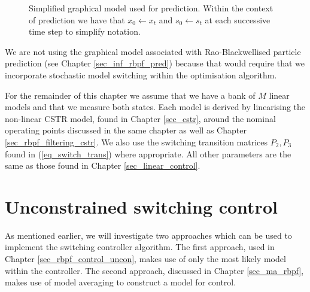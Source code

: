 \begin{figure}[H] 
\centering
{}
\caption{Simplified graphical model used for prediction. Within the context of prediction we have that $x_0 \leftarrow x_t$ and $s_0 \leftarrow s_t$ at each successive time step to simplify notation.}
\label{fig_gm_prediction}
\end{figure}
We are not using the graphical model associated with Rao-Blackwellised particle prediction (see Chapter \ref{sec_inf_rbpf_pred}) because that would require that we incorporate stochastic model switching within the optimisation algorithm. 

For the remainder of this chapter we assume that we have a bank of $M$ linear models and that we measure both states. Each model is derived by linearising the non-linear CSTR model, found in Chapter \ref{sec_cstr}, around the nominal operating points discussed in the same chapter as well as Chapter \ref{sec_rbpf_filtering_cstr}. We also use the switching transition matrices $P_2, P_3$ found in (\ref{eq_switch_trans}) where appropriate. All other parameters are the same as those found in Chapter \ref{sec_linear_control}.
\section{Unconstrained switching control}
As mentioned earlier, we will investigate two approaches which can be used to implement the switching controller algorithm. The first approach, used in Chapter \ref{sec_rbpf_control_uncon}, makes use of only the most likely model within the controller. The second approach, discussed in Chapter \ref{sec_ma_rbpf}, makes use of model averaging to construct a model for control.  
